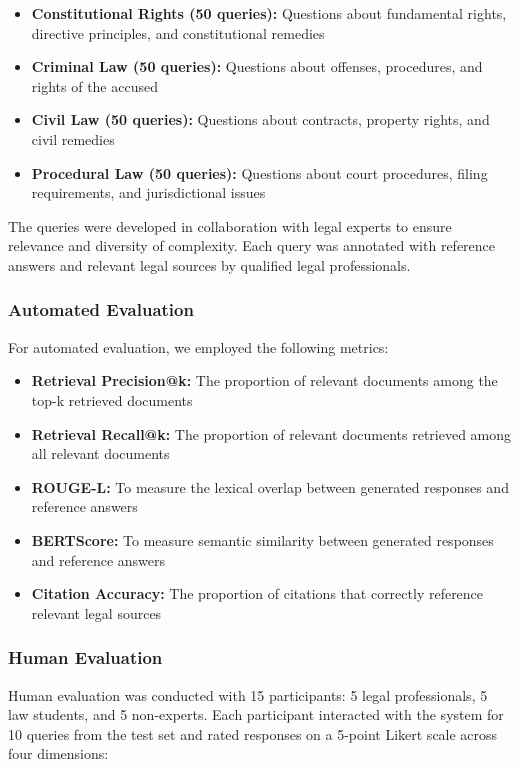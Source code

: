 \documentclass[conference]{IEEEtran}
\begin{document}
\begin{itemize}
    \item \textbf{Constitutional Rights (50 queries):} Questions about fundamental rights, directive principles, and constitutional remedies
    \item \textbf{Criminal Law (50 queries):} Questions about offenses, procedures, and rights of the accused
    \item \textbf{Civil Law (50 queries):} Questions about contracts, property rights, and civil remedies
    \item \textbf{Procedural Law (50 queries):} Questions about court procedures, filing requirements, and jurisdictional issues
\end{itemize}

The queries were developed in collaboration with legal experts to ensure relevance and diversity of complexity. Each query was annotated with reference answers and relevant legal sources by qualified legal professionals.

\subsubsection{Automated Evaluation}

For automated evaluation, we employed the following metrics:

\begin{itemize}
    \item \textbf{Retrieval Precision@k:} The proportion of relevant documents among the top-k retrieved documents
    \item \textbf{Retrieval Recall@k:} The proportion of relevant documents retrieved among all relevant documents
    \item \textbf{ROUGE-L:} To measure the lexical overlap between generated responses and reference answers
    \item \textbf{BERTScore:} To measure semantic similarity between generated responses and reference answers
    \item \textbf{Citation Accuracy:} The proportion of citations that correctly reference relevant legal sources
\end{itemize}

\subsubsection{Human Evaluation}

Human evaluation was conducted with 15 participants: 5 legal professionals, 5 law students, and 5 non-experts. Each participant interacted with the system for 10 queries from the test set and rated responses on a 5-point Likert scale across four dimensions:
\end{document}

